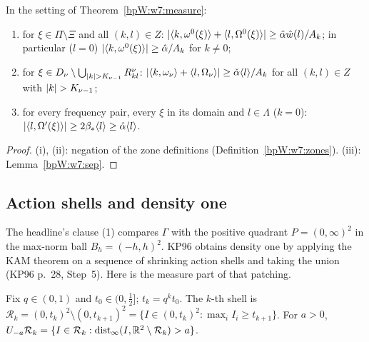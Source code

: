 \begin{corollary}\label{bpW:w7:melnikov}
In the setting of Theorem~\ref{bpW:w7:measure}:
\begin{enumerate}[label=(\roman*)]
\item for $\xi\in\Pi\setminus\Xi$ and all $(k,l)\in Z$:
  $\lvert \langle k,\omega^0(\xi)\rangle+\langle l,\Omega^0(\xi)\rangle\rvert\ge\hat\alpha\hat w(l)/A_k$; in particular ($l=0$)
  $\lvert \langle k,\omega^0(\xi)\rangle\rvert\ge\hat\alpha/A_k$ for $k\ne0$;
\item for $\xi\in D_\nu\setminus\bigcup_{\lvert k\rvert>K_{\nu-1}}R^\nu_{kl}$: $\lvert \langle k,\omega_\nu\rangle+\langle l,\Omega_\nu\rangle\rvert
  \ge\check\alpha\langle l\rangle/A_k$ for all $(k,l)\in Z$ with $\lvert k\rvert>K_{\nu-1}$;
\item for every frequency pair, every $\xi$ in its domain and $l\in\Lambda$ ($k=0$):
  $\lvert \langle l,\Omega'(\xi)\rangle\rvert\ge2\beta_*\langle l\rangle\ge\hat\alpha\langle l\rangle$.
\end{enumerate}
\end{corollary}
\begin{proof}
(i), (ii): negation of the zone definitions (Definition~\ref{bpW:w7:zones}). (iii): Lemma~\ref{bpW:w7:sep}.
\end{proof}

\subsection{Action shells and density one}\label{bpW:w7:density-sec}

The headline's clause (1) compares $\Gamma$ with the positive quadrant $P=(0,\infty)^2$ in the max-norm ball
$B_h=(-h,h)^2$. KP96 obtains density one by applying the KAM theorem on a sequence of shrinking action shells and
taking the union (KP96 p.~28, Step~5). Here is the measure part of that patching.

\begin{definition}[Shells]\label{bpW:w7:shells}
Fix $q\in(0,1)$ and $t_0\in(0,\frac12]$; $t_k=q^kt_0$. The $k$-th shell is
$\mathcal R_k=(0,t_k)^2\setminus(0,t_{k+1})^2=\{I\in(0,t_k)^2:\max_iI_i\ge t_{k+1}\}$. For $a>0$,
$U_{-a}\mathcal R_k=\{I\in\mathcal R_k:\operatorname{dist}_\infty(I,\mathbb{R}^2\setminus\mathcal R_k)>a\}$.
\end{definition}

